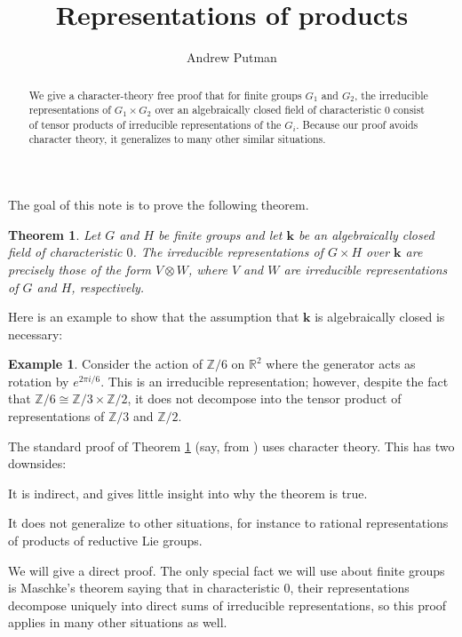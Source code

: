 \documentclass[11pt]{article}
\title{\vspace{-50pt}Representations of products}
\author{Andrew Putman\vspace{-6pt}}
\date{}
\numberwithin{equation}{section}
\theoremstyle{plain}
\newtheorem{maintheorem}{Theorem}
\theoremstyle{definition}
\newtheorem*{example}{Example}
\newcommand\R{\ensuremath{\mathbb{R}}}
\newcommand\Z{\ensuremath{\mathbb{Z}}}
\newcommand\bk{\ensuremath{\mathbf{k}}}
\begin{document}
\maketitle

\begin{abstract}
We give a character-theory free proof that for finite groups $G_1$ and $G_2$, the
irreducible representations of $G_1 \times G_2$ over an algebraically closed
field of characteristic $0$ consist of tensor
products of irreducible representations of the $G_i$.  Because our
proof avoids character theory, it generalizes to many other similar situations.
\end{abstract}

The goal of this note is to prove the following theorem.

\begin{maintheorem}
\label{theorem:main}
Let $G$ and $H$ be finite groups and let $\bk$ be an algebraically closed field of
characteristic $0$.  The irreducible representations
of $G \times H$ over $\bk$ are precisely those of the form $V \otimes W$, where
$V$ and $W$ are irreducible representations of $G$ and $H$, respectively.
\end{maintheorem}

\noindent
Here is an example to show that the assumption that $\bk$ is algebraically closed
is necessary:

\begin{example}
Consider the action of $\Z/6$ on $\R^2$ where the generator acts as rotation by
$e^{2\pi i/6}$.  This is an irreducible representation; however, despite the fact
that $\Z/6 \cong \Z/3 \times \Z/2$, it does not decompose into the tensor
product of representations of $\Z/3$ and $\Z/2$.
\end{example}

The standard proof of Theorem \ref{theorem:main} (say, from \cite{SerreBook}) uses character theory.  This
has two downsides:
\begin{compactitem}
\item It is indirect, and gives little insight into why the theorem is true.
\item It does not generalize to other situations, for instance to rational representations
of products of reductive Lie groups.
\end{compactitem}
We will give a direct proof.  The only special fact we will use about finite groups
is Maschke's theorem saying that in characteristic $0$, their representations decompose uniquely
into direct sums of irreducible representations, so this proof applies in many other
situations as well.
\end{document}
